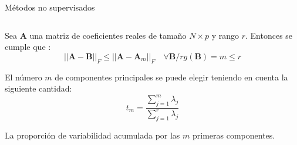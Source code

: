 \begin{frame}{Métodos no supervisados}
\begin{columns}
\begin{column}{0.9\textwidth}
\begin{teorema}
Sea \textbf{A} una matriz de coeficientes reales de tamaño $N\times p$ y rango $r$. Entonces se cumple que :
\begin{equation}
||\textbf{A}-\textbf{B}||_F\leq ||\textbf{A}-\textbf{A}_m||_F \quad \forall \textbf{B}/ rg(\textbf{B})=m \leq r
\end{equation} 
\end{teorema}

El número $m$ de componentes principales se puede elegir teniendo en cuenta la siguiente cantidad:
\begin{equation}
t_m=\dfrac{\sum_{j=1}^{m}\lambda_j} {\sum_{j=1}^{r}\lambda_j}
\end{equation}

La proporción de variabilidad acumulada por las $m$ primeras componentes.

\end{column}
\end{columns}
\end{frame}